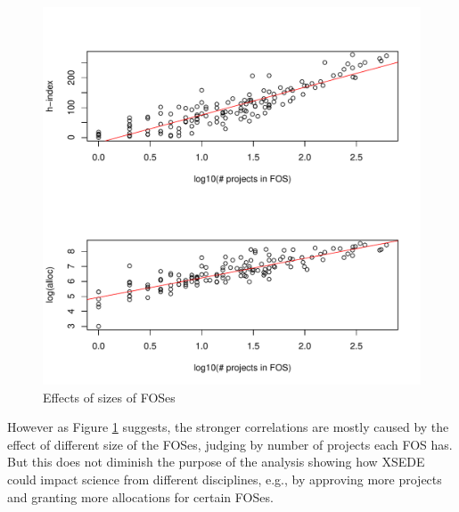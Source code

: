 \begin{figure}[htb]
  \centering
    \includegraphics[width=1.0\columnwidth]{images/05_hindexalloc_vs_nprojects_fos_trended.pdf}
  \caption{Effects of sizes of FOSes}\label{F:hindexalloc-vs-nprojects-fos-trended}
\end{figure}

However as Figure \ref{F:hindexalloc-vs-nprojects-fos-trended} suggests, the stronger correlations are mostly caused by the effect of different size of the FOSes, judging by number of projects each FOS has. But this does not diminish the purpose of the analysis showing how XSEDE could impact science from different disciplines, e.g., by approving more projects and granting more allocations for certain FOSes.

